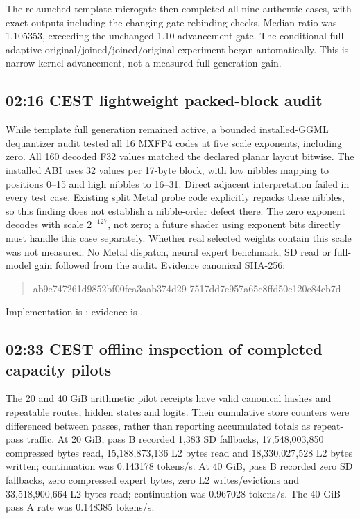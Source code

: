 The relaunched template microgate then completed all nine authentic cases,
with exact outputs including the changing-gate rebinding checks. Median ratio
was 1.105353, exceeding the unchanged 1.10 advancement gate. The conditional
full adaptive original/joined/joined/original experiment began automatically.
This is narrow kernel advancement, not a measured full-generation gain.

\subsection{02:16 CEST lightweight packed-block audit}
While template full generation remained active, a bounded installed-GGML
dequantizer audit tested all 16 MXFP4 codes at five scale exponents, including
zero. All 160 decoded F32 values matched the declared planar layout bitwise.
The installed ABI uses 32 values per 17-byte block, with low nibbles mapping
to positions 0--15 and high nibbles to 16--31. Direct adjacent interpretation
failed in every test case. Existing split Metal probe code explicitly repacks
these nibbles, so this finding does not establish a nibble-order defect there.
The zero exponent decodes with scale $2^{-127}$, not zero; a future shader
using exponent bits directly must handle this case separately. Whether real
selected weights contain this scale was not measured. No Metal dispatch,
neural expert benchmark, SD read or full-model gain followed from the audit.
Evidence canonical SHA-256:
\begin{quote}\ttfamily\small
ab9e747261d9852bf00fca3aab374d29\allowbreak
7517dd7e957a65c8ffd50e120c84cb7d
\end{quote}
Implementation is
; evidence is
.

\subsection{02:33 CEST offline inspection of completed capacity pilots}
The 20 and 40 GiB arithmetic pilot receipts have valid canonical hashes and
repeatable routes, hidden states and logits. Their cumulative store counters
were differenced between passes, rather than reporting accumulated totals as
repeat-pass traffic. At 20 GiB, pass B recorded 1,383 SD fallbacks,
17,548,003,850 compressed bytes read, 15,188,873,136 L2 bytes read and
18,330,027,528 L2 bytes written; continuation was 0.143178 tokens/s.
At 40 GiB, pass B recorded zero SD fallbacks, zero compressed expert bytes,
zero L2 writes/evictions and 33,518,900,664 L2 bytes read; continuation was
0.967028 tokens/s. The 40 GiB pass A rate was 0.148385 tokens/s.

